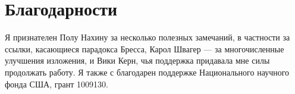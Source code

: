 \chapter*{Благодарности}
Я признателен Полу Нахину за несколько полезных замечаний, в частности за ссылки, касающиеся парадокса Бресса,
Карол Швагер — за многочисленные улучшения изложения,
и
Вики Керн, чья поддержка придавала мне силы продолжать работу.
Я также с благодарен поддержке Национального научного фонда США, грант 1009130.
